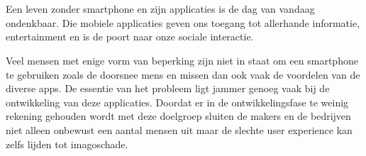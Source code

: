 
\chapter{}
\label{ch:inleiding}


\section{}
\label{sec:probleemstelling}
Een leven zonder smartphone en zijn applicaties is de dag van vandaag ondenkbaar.  Die mobiele applicaties geven ons toegang tot allerhande informatie, entertainment en is de poort naar onze sociale interactie.

Veel mensen met enige vorm van beperking zijn niet in staat om een smartphone te gebruiken zoals de doorsnee mens en missen dan ook vaak de voordelen van de diverse apps. De essentie van het probleem ligt jammer genoeg vaak bij de ontwikkeling van deze applicaties.  Doordat er in de ontwikkelingsfase te weinig rekening gehouden wordt met deze doelgroep sluiten de makers en de bedrijven niet alleen onbewust een aantal mensen uit maar de slechte user experience kan zelfs lijden tot imagoschade.  

